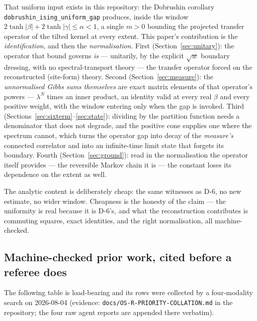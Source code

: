 \documentclass[11pt]{article}
\newcommand{\lean}[1]{\texttt{#1}}
\begin{document}
That uniform input exists in this repository: the Dobrushin corollary
\lean{dobrushin\_ising\_uniform\_gap} produces, inside the window
$2\tanh|\beta| + 2\tanh|\gamma| \le \alpha < 1$, a single $m>0$
bounding the projected transfer operator of the tilted kernel at every
extent.  This paper's contribution is the \emph{identification}, and
then the \emph{normalisation}.  First (Section~\ref{sec:unitary}): the
operator that bound governs \emph{is} --- unitarily, by the explicit
$\sqrt{w}$ boundary dressing, with no spectral-transport theory --- the
transfer operator forced on the reconstructed (site-form) theory.
Second (Section~\ref{sec:measure}): the \emph{unnormalised Gibbs sums
themselves} are exact matrix elements of that operator's powers ---
$\lambda^N$ times an inner product, an identity valid at every real
$\beta$ and every positive weight, with the window entering only when
the gap is invoked.  Third (Sections~\ref{sec:sixterm}--\ref{sec:state}):
dividing by the partition function needs a denominator that does not
degrade, and the positive cone supplies one where the spectrum cannot,
which turns the operator gap into decay of the \emph{measure's} connected
correlator and into an infinite-time limit state that forgets its
boundary.  Fourth (Section~\ref{sec:ground}): read in the normalisation
the operator itself provides --- the reversible Markov chain it is --- the
constant loses its dependence on the extent as well.

The analytic content is deliberately cheap: the same witnesses as D-6, no
new estimate, no wider window.  Cheapness is the honesty of the claim ---
the uniformity is real because it is D-6's, and what the reconstruction
contributes is commuting squares, exact identities, and the right
normalisation, all machine-checked.

\subsection{Machine-checked prior work, cited before a referee does}
\label{sec:prior}
The following table is load-bearing and its rows were collected by a
four-modality search on 2026-08-04 (evidence:
\lean{docs/OS-R-PRIORITY-COLLATION.md} in the repository; the four raw
agent reports are appended there verbatim).
\end{document}
